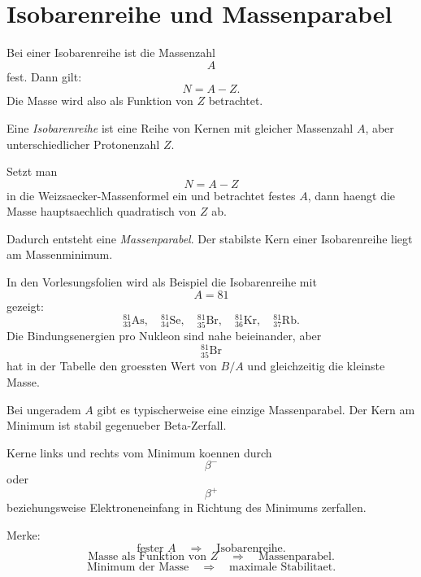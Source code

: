 \section{Isobarenreihe und Massenparabel}

Bei einer Isobarenreihe ist die Massenzahl
\[
    A
\]
fest.
Dann gilt:
\[
    N=A-Z.
\]
Die Masse wird also als Funktion von $Z$ betrachtet.

\begin{definitionbox}
Eine \emph{Isobarenreihe} ist eine Reihe von Kernen mit gleicher Massenzahl $A$,
aber unterschiedlicher Protonenzahl $Z$.
\end{definitionbox}

\begin{conceptbox}
Setzt man
\[
    N=A-Z
\]
in die Weizsaecker-Massenformel ein und betrachtet festes $A$, dann haengt die Masse
hauptsaechlich quadratisch von $Z$ ab.

Dadurch entsteht eine \emph{Massenparabel}.
Der stabilste Kern einer Isobarenreihe liegt am Massenminimum.
\end{conceptbox}

\begin{examplebox}
In den Vorlesungsfolien wird als Beispiel die Isobarenreihe mit
\[
    A=81
\]
gezeigt:
\[
    {}^{81}_{33}\mathrm{As},
    \quad
    {}^{81}_{34}\mathrm{Se},
    \quad
    {}^{81}_{35}\mathrm{Br},
    \quad
    {}^{81}_{36}\mathrm{Kr},
    \quad
    {}^{81}_{37}\mathrm{Rb}.
\]
Die Bindungsenergien pro Nukleon sind nahe beieinander, aber
\[
    {}^{81}_{35}\mathrm{Br}
\]
hat in der Tabelle den groessten Wert von $B/A$ und gleichzeitig die kleinste Masse.
\end{examplebox}

\begin{conceptbox}
Bei ungeradem $A$ gibt es typischerweise eine einzige Massenparabel.
Der Kern am Minimum ist stabil gegenueber Beta-Zerfall.

Kerne links und rechts vom Minimum koennen durch
\[
    \beta^-
\]
oder
\[
    \beta^+
\]
beziehungsweise Elektroneneinfang in Richtung des Minimums zerfallen.
\end{conceptbox}

\begin{examtipbox}
Merke:
\[
    \text{fester } A
    \quad\Rightarrow\quad
    \text{Isobarenreihe}.
\]
\[
    \text{Masse als Funktion von } Z
    \quad\Rightarrow\quad
    \text{Massenparabel}.
\]
\[
    \text{Minimum der Masse}
    \quad\Rightarrow\quad
    \text{maximale Stabilitaet}.
\]
\end{examtipbox}

